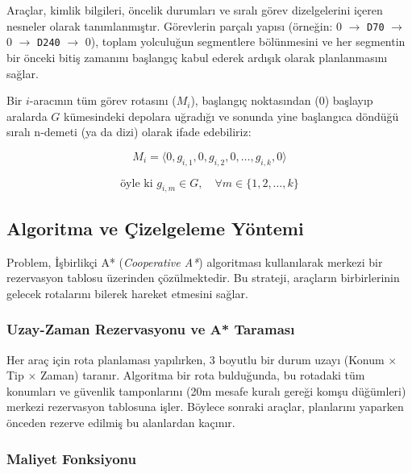 Araçlar, kimlik bilgileri, öncelik durumları ve sıralı görev dizelgelerini içeren nesneler olarak tanımlanmıştır. Görevlerin parçalı yapısı (örneğin: 0 $\to$ \texttt{D70} $\to$ 0 $\to$ \texttt{D240} $\to$ 0), toplam yolculuğun segmentlere bölünmesini ve her segmentin bir önceki bitiş zamanını başlangıç kabul ederek ardışık olarak planlanmasını sağlar.

Bir $i$-aracının tüm görev rotasını ($M_i$), başlangıç noktasından (0) başlayıp aralarda $G$ kümesindeki depolara uğradığı ve sonunda yine başlangıca döndüğü sıralı n-demeti (ya da dizi) olarak ifade edebiliriz:

\begin{equation}
    M_i = \langle 0, g_{i,1}, 0, g_{i,2}, 0, \dots, g_{i,k}, 0 \rangle
\end{equation}

\begin{equation}
    \text{öyle ki } g_{i,m} \in G, \quad \forall m \in \{1, 2, \dots, k\}
\end{equation}


\subsection{Algoritma ve Çizelgeleme Yöntemi}

Problem, İşbirlikçi A* (\textit{Cooperative A*}) algoritması kullanılarak merkezi bir rezervasyon tablosu üzerinden çözülmektedir. Bu strateji, araçların birbirlerinin gelecek rotalarını bilerek hareket etmesini sağlar.

\subsubsection{Uzay-Zaman Rezervasyonu ve A* Taraması}

Her araç için rota planlaması yapılırken, 3 boyutlu bir durum uzayı (Konum $\times$ Tip $\times$ Zaman) taranır. Algoritma bir rota bulduğunda, bu rotadaki tüm konumları ve güvenlik tamponlarını (20m mesafe kuralı gereği komşu düğümleri) merkezi rezervasyon tablosuna işler. Böylece sonraki araçlar, planlarını yaparken önceden rezerve edilmiş bu alanlardan kaçınır.

\subsubsection{Maliyet Fonksiyonu} \label{sec:maliyet-fonksiyonu}

